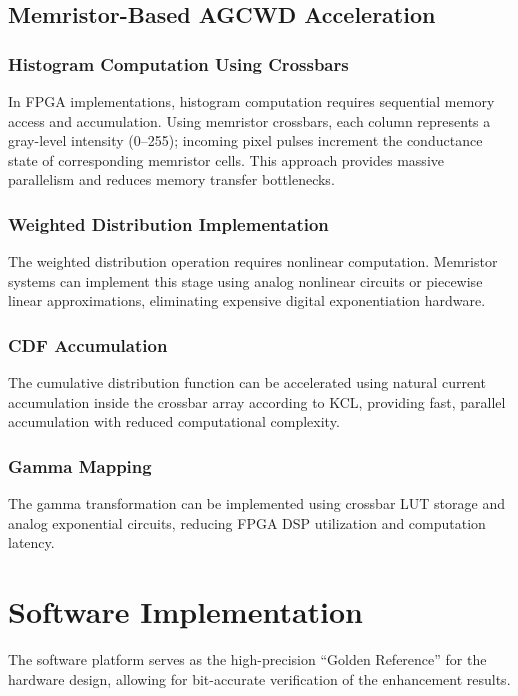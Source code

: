 \documentclass[conference]{IEEEtran}
\begin{document}
\subsection{Memristor-Based AGCWD Acceleration}

\subsubsection{Histogram Computation Using Crossbars}
In FPGA implementations, histogram computation requires sequential memory access and accumulation. Using memristor crossbars, each column represents a gray-level intensity (0--255); incoming pixel pulses increment the conductance state of corresponding memristor cells. This approach provides massive parallelism and reduces memory transfer bottlenecks.

\subsubsection{Weighted Distribution Implementation}
The weighted distribution operation requires nonlinear computation. Memristor systems can implement this stage using analog nonlinear circuits or piecewise linear approximations, eliminating expensive digital exponentiation hardware.

\subsubsection{CDF Accumulation}
The cumulative distribution function can be accelerated using natural current accumulation inside the crossbar array according to KCL, providing fast, parallel accumulation with reduced computational complexity.

\subsubsection{Gamma Mapping}
The gamma transformation can be implemented using crossbar LUT storage and analog exponential circuits, reducing FPGA DSP utilization and computation latency.

\section{Software Implementation}
\label{sec:software}

The software platform serves as the high-precision ``Golden Reference'' for the hardware design, allowing for bit-accurate verification of the enhancement results. 
\end{document}
